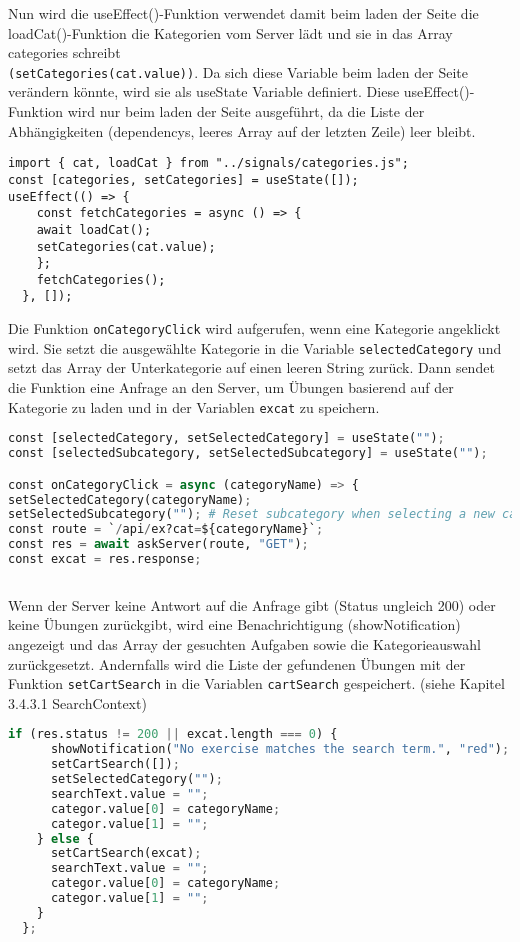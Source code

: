 Nun wird die useEffect()-Funktion verwendet damit beim laden der Seite die loadCat()-Funktion die Kategorien vom Server lädt und sie in das Array categories schreibt \\\texttt{(setCategories(cat.value))}. Da sich diese Variable beim laden der Seite verändern könnte, wird sie als useState Variable definiert. 
Diese useEffect()-Funktion wird nur beim laden der Seite ausgeführt, da die Liste der Abhängigkeiten (dependencys, leeres Array auf der letzten Zeile) leer bleibt. 

\begin{lstlisting}
import { cat, loadCat } from "../signals/categories.js";
const [categories, setCategories] = useState([]);
useEffect(() => {
    const fetchCategories = async () => {
    await loadCat();
    setCategories(cat.value);
    };
    fetchCategories();
  }, []);

\end{lstlisting}


Die Funktion \texttt{onCategoryClick} wird aufgerufen, wenn eine Kategorie angeklickt wird. Sie setzt die ausgewählte Kategorie in die Variable \texttt{selectedCategory} und setzt das Array der Unterkategorie auf einen leeren String zurück. Dann sendet die Funktion eine Anfrage an den Server, um Übungen basierend auf der Kategorie zu laden und in der Variablen \texttt{excat} zu speichern.

\begin{lstlisting}[language=Python]
const [selectedCategory, setSelectedCategory] = useState("");
const [selectedSubcategory, setSelectedSubcategory] = useState("");

const onCategoryClick = async (categoryName) => {
setSelectedCategory(categoryName);
setSelectedSubcategory(""); # Reset subcategory when selecting a new category
const route = `/api/ex?cat=${categoryName}`;
const res = await askServer(route, "GET");
const excat = res.response;
    
\end{lstlisting}

 Wenn der Server keine Antwort auf die Anfrage gibt (Status ungleich 200) oder keine Übungen zurückgibt, wird eine Benachrichtigung (showNotification) angezeigt und das Array der gesuchten Aufgaben sowie die Kategorieauswahl zurückgesetzt. Andernfalls wird die Liste der gefundenen Übungen mit der Funktion \texttt{setCartSearch} in die Variablen \texttt{cartSearch} gespeichert. (siehe Kapitel 3.4.3.1 SearchContext)


\begin{lstlisting}[language=Python]
    if (res.status != 200 || excat.length === 0) {
      showNotification("No exercise matches the search term.", "red");
      setCartSearch([]);
      setSelectedCategory("");
      searchText.value = "";
      categor.value[0] = categoryName;
      categor.value[1] = "";
    } else {
      setCartSearch(excat);
      searchText.value = "";
      categor.value[0] = categoryName;
      categor.value[1] = "";
    }
  };


\end{lstlisting}



